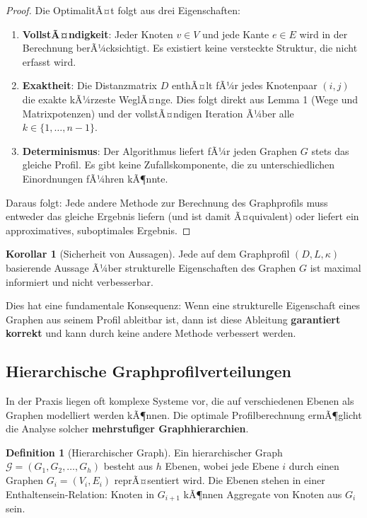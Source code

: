 ﻿\documentclass[a4paper,12pt]{article}
\theoremstyle{definition}
\newtheorem{definition}{Definition}
\newtheorem{korollar}{Korollar}
\begin{document}
	\begin{proof}
		Die OptimalitÃ¤t folgt aus drei Eigenschaften:
		\begin{enumerate}
			\item \textbf{VollstÃ¤ndigkeit}: Jeder Knoten $v \in V$ und jede Kante $e \in E$ wird in der Berechnung berÃ¼cksichtigt. Es existiert keine versteckte Struktur, die nicht erfasst wird.
			\item \textbf{Exaktheit}: Die Distanzmatrix $D$ enthÃ¤lt fÃ¼r jedes Knotenpaar $(i,j)$ die exakte kÃ¼rzeste WeglÃ¤nge. Dies folgt direkt aus Lemma 1 (Wege und Matrixpotenzen) und der vollstÃ¤ndigen Iteration Ã¼ber alle $k \in \{1, \ldots, n-1\}$.
			\item \textbf{Determinismus}: Der Algorithmus liefert fÃ¼r jeden Graphen $G$ stets das gleiche Profil. Es gibt keine Zufallskomponente, die zu unterschiedlichen Einordnungen fÃ¼hren kÃ¶nnte.
		\end{enumerate}
		Daraus folgt: Jede andere Methode zur Berechnung des Graphprofils muss entweder das gleiche Ergebnis liefern (und ist damit Ã¤quivalent) oder liefert ein approximatives, suboptimales Ergebnis.
	\end{proof}
	
	\begin{korollar}[Sicherheit von Aussagen]
		Jede auf dem Graphprofil $(D, L, \kappa)$ basierende Aussage Ã¼ber strukturelle Eigenschaften des Graphen $G$ ist maximal informiert und nicht verbesserbar.
	\end{korollar}
	
	Dies hat eine fundamentale Konsequenz: Wenn eine strukturelle Eigenschaft eines Graphen aus seinem Profil ableitbar ist, dann ist diese Ableitung \textbf{garantiert korrekt} und kann durch keine andere Methode verbessert werden.
	
	\subsection{Hierarchische Graphprofilverteilungen}
	
	In der Praxis liegen oft komplexe Systeme vor, die auf verschiedenen Ebenen als Graphen modelliert werden kÃ¶nnen. Die optimale Profilberechnung ermÃ¶glicht die Analyse solcher \textbf{mehrstufiger Graphhierarchien}.
	
	\begin{definition}[Hierarchischer Graph]
		Ein hierarchischer Graph $\mathcal{G} = (G_1, G_2, \ldots, G_h)$ besteht aus $h$ Ebenen, wobei jede Ebene $i$ durch einen Graphen $G_i = (V_i, E_i)$ reprÃ¤sentiert wird. Die Ebenen stehen in einer Enthaltensein-Relation: Knoten in $G_{i+1}$ kÃ¶nnen Aggregate von Knoten aus $G_i$ sein.
	\end{definition}
	
\end{document}
